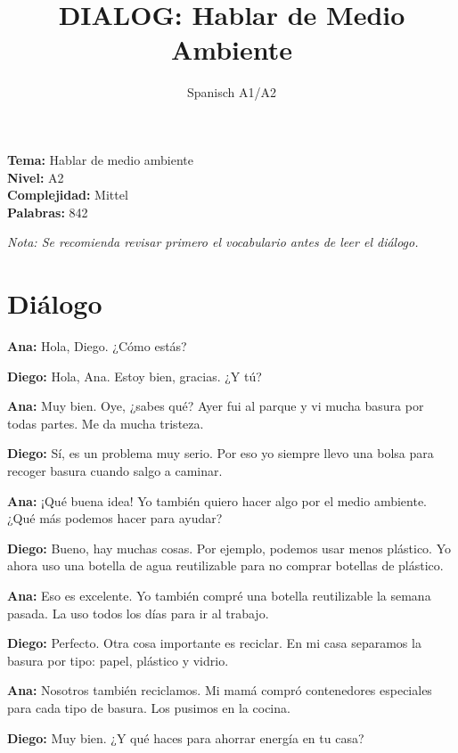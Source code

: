 \documentclass[12pt,a4paper]{article}
\begin{document}
\title{\textbf{DIALOG: Hablar de Medio Ambiente}}
\author{Spanisch A1/A2}
\date{}
\maketitle

\textbf{Tema:} Hablar de medio ambiente \\
\textbf{Nivel:} A2 \\
\textbf{Complejidad:} Mittel \\
\textbf{Palabras:} 842


\textit{Nota: Se recomienda revisar primero el vocabulario antes de leer el diálogo.}


\section*{Diálogo}

\textbf{Ana:} Hola, Diego. ¿Cómo estás?

\textbf{Diego:} Hola, Ana. Estoy bien, gracias. ¿Y tú?

\textbf{Ana:} Muy bien. Oye, ¿sabes qué? Ayer fui al parque y vi mucha basura por todas partes. Me da mucha tristeza.

\textbf{Diego:} Sí, es un problema muy serio. Por eso yo siempre llevo una bolsa para recoger basura cuando salgo a caminar.

\textbf{Ana:} ¡Qué buena idea! Yo también quiero hacer algo por el medio ambiente. ¿Qué más podemos hacer para ayudar?

\textbf{Diego:} Bueno, hay muchas cosas. Por ejemplo, podemos usar menos plástico. Yo ahora uso una botella de agua reutilizable para no comprar botellas de plástico.

\textbf{Ana:} Eso es excelente. Yo también compré una botella reutilizable la semana pasada. La uso todos los días para ir al trabajo.

\textbf{Diego:} Perfecto. Otra cosa importante es reciclar. En mi casa separamos la basura por tipo: papel, plástico y vidrio.

\textbf{Ana:} Nosotros también reciclamos. Mi mamá compró contenedores especiales para cada tipo de basura. Los pusimos en la cocina.

\textbf{Diego:} Muy bien. ¿Y qué haces para ahorrar energía en tu casa?
\end{document}
